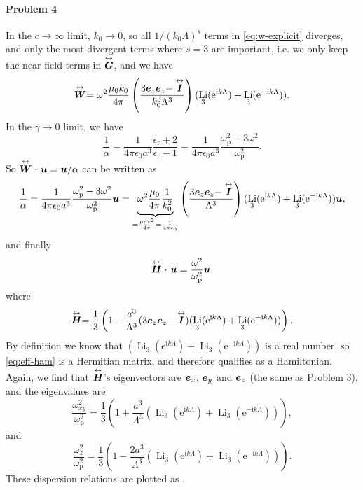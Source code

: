 \documentclass[hyperref, a4paper]{article}
\newcommand*{\ii}{\mathrm{i}}
\newcommand*{\ee}{\mathrm{e}}
\DeclareMathOperator{\li}{Li}
\renewcommand{\tensor}[1]{ \stackrel{\leftrightarrow}{\vb*{#1}}}
\begin{document}
\paragraph{}

\paragraph{Problem 4} In the $c \to \infty$ limit, $k_0 \to 0$, so all $1 / (k_0 \Lambda)^s$ terms in \eqref{eq:w-explicit} diverges,
and only the most divergent terms where $s=3$ are important, i.e. we only keep the near field terms 
in $\tensor{\vb*{G}}$, and we have 
\[
    \tensor{\vb*{W}} = \omega^2 \frac{\mu_0 k_0}{4 \pi} \left( \frac{3 \vb*{e}_z \vb*{e}_z - \tensor{\vb*{I}}}{k_0^3 \Lambda^3} \right) (\li_3(\ee^{\ii k \Lambda}) + \li_3 (\ee^{- \ii k \Lambda})).
\] 
In the $\gamma \to 0$ limit, we have 
\[
    \frac{1}{\alpha} = \frac{1}{4 \pi \epsilon_0 a^3} \frac{\epsilon_\text{r} + 2}{\epsilon_\text{r} - 1}
    = \frac{1}{4 \pi \epsilon_0 a^3} \frac{\omega_\text{p}^2 - 3 \omega^2}{\omega_\text{p}^2}. 
\]
So $\tensor{\vb*{W}} \cdot \ \vb*{u} = \vb*{u} / \alpha$ can be written as
\[
    \frac{1}{\alpha} = \frac{1}{4 \pi \epsilon_0 a^3} \frac{\omega_\text{p}^2 - 3 \omega^2}{\omega_\text{p}^2} \vb*{u} = \underbrace{\omega^2 \frac{\mu_0 }{4 \pi} \frac{1}{k_0^2}}_{= \frac{\mu_0 c^2}{4\pi} = \frac{1}{4 \pi \epsilon_0}} \left( \frac{3 \vb*{e}_z \vb*{e}_z - \tensor{\vb*{I}}}{ \Lambda^3} \right) (\li_3(\ee^{\ii k \Lambda}) + \li_3 (\ee^{- \ii k \Lambda})) \vb*{u},
\]
and finally  
\begin{equation}
    \tensor{\vb*{H}} \cdot \ \vb*{u} = \frac{\omega^2}{\omega_\text{p}^2} \vb*{u},
\end{equation}
where 
\begin{equation}
    \tensor{\vb*{H}} = \frac{1}{3} \left(1 - \frac{a^3}{\Lambda^3} (3 \vb*{e}_z \vb*{e}_z - \tensor{\vb*{I}}) (\li_3(\ee^{\ii k \Lambda}) + \li_3 (\ee^{- \ii k \Lambda})) \right) .
    \label{eq:eff-ham}
\end{equation}
By definition we know that $(\li_3(\ee^{\ii k \Lambda}) + \li_3 (\ee^{- \ii k \Lambda}))$ is a real number, so 
\eqref{eq:eff-ham} is a Hermitian matrix, and therefore qualifies as a Hamiltonian. Again, we find that 
$\tensor{\vb*{H}}$'s eigenvectors are $\vb*{e}_x$, $\vb*{e}_y$ and $\vb*{e}_z$ (the same as Problem 3), and the eigenvalues are 
\begin{equation}
    \frac{\omega_{xy}^2}{\omega_\text{p}^2} = \frac{1}{3} \left( 1 + \frac{a^3}{\Lambda^3} (\li_3(\ee^{\ii k \Lambda}) + \li_3 (\ee^{- \ii k \Lambda})) \right) ,
    \label{eq:omega-xy}
\end{equation}
and 
\begin{equation}
    \frac{\omega_{z}^2}{\omega_\text{p}^2} = \frac{1}{3} \left( 1 - \frac{2a^3}{\Lambda^3} (\li_3(\ee^{\ii k \Lambda}) + \li_3 (\ee^{- \ii k \Lambda})) \right) .
    \label{eq:omega-z}
\end{equation}
These dispersion relations are plotted as . 
\end{document}

